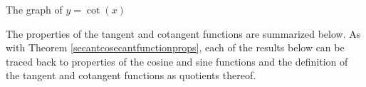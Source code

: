 \noindent\begin{minipage}{\textwidth}
\begin{center}
\end{center}
\captionsetup{type=figure}
\caption{The graph of $y = \cot(x)$}\label{fig:cotgraph2}
\end{minipage}

\medskip


The properties of the tangent and cotangent functions are summarized below. As with Theorem \ref{secantcosecantfunctionprops}, each of the results below can be traced back to properties of the cosine and sine functions and the definition of the tangent and cotangent functions as quotients thereof. 

\smallskip

